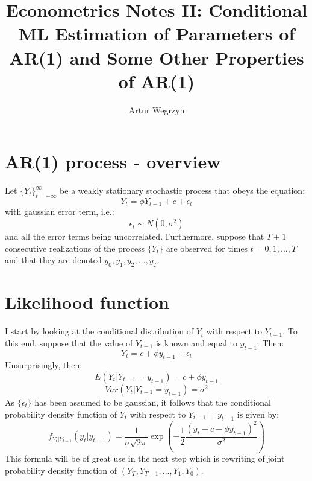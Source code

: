 \documentclass[12pt]{article}
\begin{document}
\title{Econometrics Notes II: Conditional ML Estimation of Parameters of AR(1) and Some Other Properties of AR(1)}
\author{Artur Wegrzyn}
\maketitle


\tableofcontents

\section{AR(1) process - overview}
Let $\{Y_t\}_{t=-\infty}^{\infty}$ be a weakly stationary stochastic process that obeys
the equation:
\begin{equation}
\label{ar1_def_eqtn}
Y_t = \phi Y_{t-1} + c + \epsilon_t
\end{equation}
with gaussian error term, i.e.:
\begin{equation}
\epsilon_t \sim N(0, \sigma^2)
\end{equation}
and all the error terms being uncorrelated. Furthermore, suppose that $T+1$ consecutive 
realizations of the process $\{Y_t\}$ are observed for times $t = 0, 1, ..., T$ and that
 they are denoted $y_0, y_1, y_2, ..., y_T$. \\
 

\section{Likelihood function}
I start by looking at the conditional distribution of $Y_t$ with respect to $Y_{t-1}$. 
To this end, suppose that the value of $Y_{t-1}$ is known and equal to $y_{t-1}$. Then:
\begin{equation*}
Y_t = c + \phi y_{t-1} + \epsilon_t
\end{equation*}
Unsurprisingly, then:
$$ E(Y_t | Y_{t-1} = y_{t-1}) = c + \phi y_{t-1} $$
$$Var(Y_t | Y_{t-1} = y_{t-1}) = \sigma^2 $$
As $\{\epsilon_t\}$ has been assumed to be gaussian, it follows that the conditional 
probability density function of $Y_t$ with respect to $Y_{t-1} = y_{t-1}$ is given by:
\begin{equation}
\label{ar_cond_density}
f_{Y_t | Y_{t-1}}(y_t | y_{t-1}) = \frac{1}{\sigma \sqrt{2 \pi}}
\exp \left( - \frac{1}{2} \frac{(y_t - c - \phi y_{t-1})^2}{\sigma^2} \right)
\end{equation}
This formula will be of great use in the next step which is rewriting of joint 
probability density function of $(Y_T, Y_{T-1}, ..., Y_1, Y_0)$. 
\end{document}

